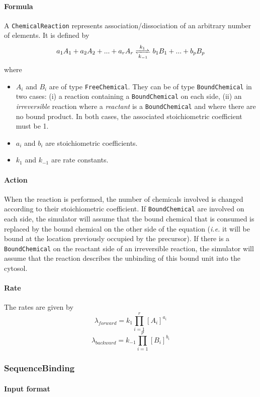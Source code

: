 \paragraph{Formula} A \texttt{ChemicalReaction} represents association/dissociation of an arbitrary number of elements. It is defined by
\[
	\reactionRev{a_1 A_1 + a_2 A_2 + ... + a_r A_r}{b_1 B_1 + ... + b_p B_p}{k_1}{k_{-1}}
\]
where
\begin{itemize}
	\item $A_i$ and $B_i$ are of type \texttt{FreeChemical}. They can be of type \texttt{BoundChemical} in two cases: (i) a reaction containing a \texttt{BoundChemical} on each side, (ii) an \emph{irreversible} reaction where a \emph{reactant} is a \texttt{BoundChemical} and where there are no bound product. In both cases, the associated stoichiometric coefficient must be 1.
	\item $a_i$ and $b_i$ are stoichiometric coefficients.
	\item $k_1$ and $k_{-1}$ are rate constants.
\end{itemize}

\paragraph{Action} When the reaction is performed, the number of chemicals involved is changed according to their stoichiometric coefficient. If \texttt{BoundChemical} are involved on each side, the simulator will assume that the bound chemical that is consumed is replaced by the bound chemical on the other side of the equation (\textit{i.e.} it will be bound at the location previously occupied by the precursor). If there is a \texttt{BoundChemical} on the reactant side of an irreversible reaction, the simulator will assume that the reaction describes the unbinding of this bound unit into the cytosol.

\paragraph{Rate} The rates are given by
\[
	\lambda_{forward} = k_1 \prod\limits_{i=1}^{r} [A_i]^{a_i}
\]
\[
	\lambda_{backward} = k_{-1} \prod\limits_{i=1}^{p} [B_i]^{b_i}
\]

\subsubsection{SequenceBinding}
\paragraph{Input format}

